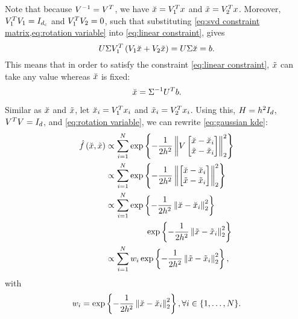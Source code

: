 Note that because $V^{-1} = V^T$, we have $\breve{x} = V_1^T x$ and $\tilde{x} = V_2^T x$.
\cstarta Moreover, $V_1^TV_1=I_{d_\mathrm{c}}$ and $V_1^T V_2 = 0$, such that \cenda substituting \cref{eq:svd constraint matrix,eq:rotation variable} into \cref{eq:linear constraint}, gives
\begin{equation}
	\label{eq:linear constraint after rotation}
	U \Sigma V_1^T \left( V_1 \breve{x} + V_2 \tilde{x} \right)
	= U \Sigma \breve{x} = b.
\end{equation}
This means that in order to satisfy the constraint \cref{eq:linear constraint}, $\tilde{x}$ can take any value whereas $\breve{x}$ is fixed:
\begin{equation}
	\label{eq:fixed part}
	\breve{x} = \Sigma^{-1} U^T b.
\end{equation}

Similar as $\breve{x}$ and $\tilde{x}$, let $\breve{x}_{i}=V_1^T x_{i}$ and $\tilde{x}_{i}=V_2^T x_{i}$. Using this, $H=h^2 I_{d}$, \cstarta $V^TV=I_{d}$, \cenda and \cref{eq:rotation variable}, we can rewrite \cref{eq:gaussian kde}:
\begin{align*}
	\densityest{\variableconstrained, \variableunconstrained} 
	&\propto \sum_{\indexdata=1}^{\numberofsamples}
	\e{ -\frac{1}{2\bandwidth^2}
		\normtwo{ V \begin{bmatrix} 
			\variableconstrained - \datapointconstrained{\indexdata} \\ 
			\variableunconstrained - \datapointunconstrained{\indexdata}
		\end{bmatrix}}^2
	} \\
	&\propto \sum_{\indexdata=1}^{\numberofsamples}
	\e{ -\frac{1}{2\bandwidth^2}
		\normtwo{ \begin{bmatrix} 
			\variableconstrained - \datapointconstrained{\indexdata} \\ 
			\variableunconstrained - \datapointunconstrained{\indexdata}
		\end{bmatrix}}^2
	} \\
	&\propto\sum_{\indexdata=1}^{\numberofsamples}
	\e{ -\frac{1}{2\bandwidth^2} \normtwo{ \variableconstrained - \datapointconstrained{\indexdata} }^2} \\
	&\superquad \e{ -\frac{1}{2\bandwidth^2} \normtwo{ \variableunconstrained - \datapointunconstrained{\indexdata} }^2} \\
	&\propto\sum_{\indexdata=1}^{\numberofsamples}
	\weight{\indexdata} \e{ -\frac{1}{2\bandwidth^2} \normtwo{ \variableunconstrained - \datapointunconstrained{\indexdata} }^2},
\end{align*}
with
\begin{equation}
	\label{eq:weights constrained simple}
	w_{i} = \exp\left\{  -\frac{1}{2h^2} \left\Vert  \breve{x} - \breve{x}_{i}  \right\Vert_2^2 \right\},
	\forall i \in \{1,\ldots,N\}.
\end{equation}

